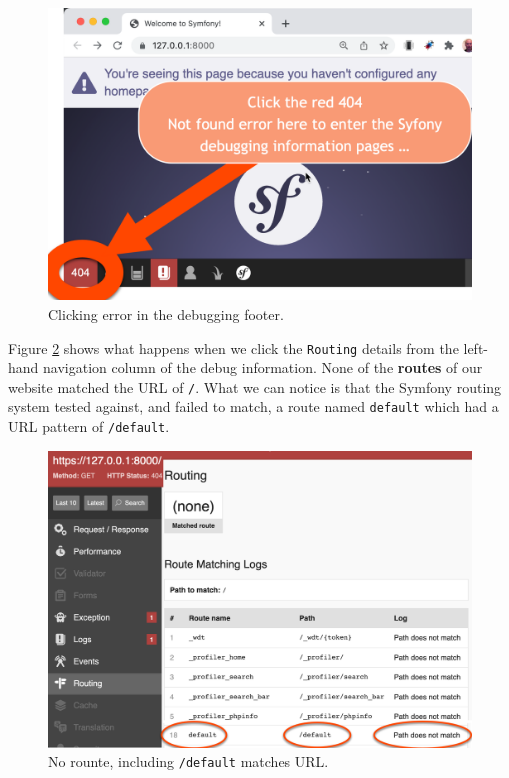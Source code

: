 \documentclass[a4paperpaper,openright]{book}
\begin{document}
\begin{figure}
\centering
\includegraphics[width=1\textwidth,height=\textheight]{./tex2pdf.-564b08cce17d66dc/d6e39948cb9fdf4d77a4c1cb81d386e6c517e7ee.png}
\caption{Clicking error in the debugging
footer.\label{404_homepage_link}}
\end{figure}

Figure \ref{no_route_matches} shows what happens when we click the
\texttt{Routing} details from the left-hand navigation column of the
debug information. None of the \textbf{routes} of our website matched
the URL of \texttt{/}. What we can notice is that the Symfony routing
system tested against, and failed to match, a route named
\texttt{default} which had a URL pattern of \texttt{/default}.

\begin{figure}
\centering
\includegraphics[width=1\textwidth,height=\textheight]{./tex2pdf.-564b08cce17d66dc/2c80a4fb4ccfecb9a3fbb31044469d298f9c2d29.png}
\caption{No rounte, including \texttt{/default} matches
URL.\label{no_route_matches}}
\end{figure}
\end{document}
